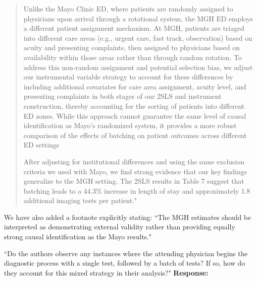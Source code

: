 \documentclass[11pt]{article}
\newenvironment{quote2}
{ \bigskip
\noindent
         \small\em
         \baselineskip=14pt
}
\newcommand{\1}{\hbox{\rm 1\kern-.35em 1}}
\begin{document}
{\begin{quote}
    Unlike the Mayo Clinic ED, where patients are randomly assigned to physicians upon arrival through a rotational system, the MGH ED employs a different patient assignment mechanism. At MGH, patients are triaged into different care areas (e.g., urgent care, fast track, observation) based on acuity and presenting complaints, then assigned to physicians based on availability within those areas rather than through random rotation. To address this non-random assignment and potential selection bias, we adjust our instrumental variable strategy to account for these differences by including additional covariates for care area assignment, acuity level, and presenting complaints in both stages of our 2SLS and instrument construction, thereby accounting for the sorting of patients into different ED zones. While this approach cannot guarantee the same level of causal identification as Mayo's randomized system, it provides a more robust comparison of the effects of batching on patient outcomes across different ED settings
    
    After adjusting for institutional differences and using the same exclusion criteria we used with Mayo, we find strong evidence that our key findings generalize to the MGH setting. The 2SLS results in Table 7 suggest that batching leads to a 44.3\% increase in length of stay and approximately 1.8 additional imaging tests per patient."
\end{quote}

We have also added a footnote explicitly stating: ``The MGH estimates should be interpreted as demonstrating external validity rather than providing equally strong causal identification as the Mayo results."

\color{black}

 \begin{quote2}
``Do the authors observe any instances where the attending physician begins the diagnostic process with a single test, followed by a batch of tests? If so, how do they account for this mixed strategy in their analysis?"
\end{quote2}

\noindent\textbf{Response:} \color{blue}{Yes, we observe mixed strategies (single test followed by batch) in 189 encounters, representing 1.91\% of multi-test encounters.

We classify these as sequential ordering based on clinical guidance from our physician coauthors at both sites. Once a physician orders an initial test, they have begun sequential information gathering — even if subsequent tests are ordered simultaneously. True batching requires all tests to be ordered simultaneously without any interim diagnostic process.

}}
\end{document}
